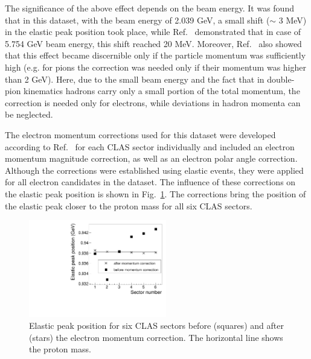 \documentclass[prc,twocolumn,superscriptaddress,showpacs,amssymb,amsmath,amsfonts,aps,nofootinbib]{revtex4-1}
\begin{document}
The significance of the above effect depends on the beam energy. It was found that in this dataset, with the beam energy of 2.039 GeV,  a small shift ($\sim$ 3 MeV) in the elastic peak position took place, while Ref.~\cite{KPark:momcorr} demonstrated that in case of  5.754 GeV beam energy, this shift reached 20 MeV. Moreover, Ref.~\cite{KPark:momcorr} also showed that this effect became discernible only if the particle momentum was sufficiently high (e.g. for pions the correction was needed only if their momentum was higher than 2 GeV). Here, due to the small beam energy and the fact that in double-pion kinematics hadrons carry only a small portion of the total momentum, the correction is needed only for electrons, while deviations in hadron momenta can be neglected.

The electron momentum corrections used for this dataset were developed according to Ref.~\cite{KPark:momcorr} for each CLAS sector individually and included an electron momentum magnitude correction, as well as an electron polar angle correction. Although the corrections were established using elastic events, they were applied for all electron candidates in the dataset.  The influence of these corrections on the elastic peak position is shown in Fig.~\ref{fig:elast_pic_position}. The corrections bring the position of the elastic peak closer to the proton mass for all six CLAS sectors.


\begin{figure}[htp]
\begin{center}
 \includegraphics[width=6cm,keepaspectratio]{pictures/mom_corr/elast_pic_position.pdf}
\vspace{-0.1cm}
\caption{Elastic peak position for six CLAS sectors before (squares) and after (stars) the electron momentum correction. The horizontal line shows the proton mass. }
\label{fig:elast_pic_position}
\end{center}
\end{figure} 
\end{document}
